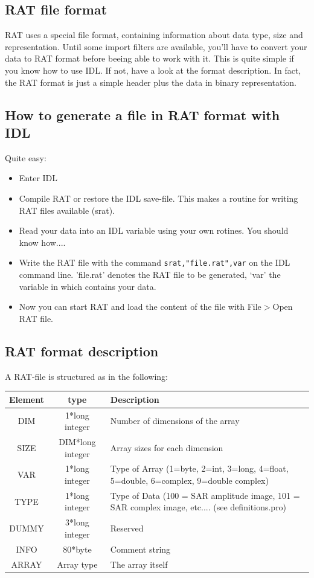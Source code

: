 \subsection{RAT file format}

RAT uses a special file format, containing information about data type, size and representation. Until some import filters are available, you'll have to convert your data to RAT format before beeing able to work with it. This is quite simple if you know how to use IDL. If not, have a look at the format description. In fact, the RAT format is just a simple header plus the data in binary representation.

\subsection{How to generate a file in RAT format with IDL}

Quite easy:
 
\begin{itemize}
	\item Enter IDL
	\item Compile RAT or restore the IDL save-file. This makes a routine for writing RAT files available (srat).
	\item Read your data into an IDL variable using your own rotines. You should know how....
	\item Write the RAT file with the command \verb*|srat,"file.rat",var| on the IDL command line. 'file.rat' denotes the RAT file to be generated, `var' the variable in which contains your data.
	\item Now you can start RAT and load the content of the file  with File$>$Open RAT file.
\end{itemize} 

\subsection{RAT format description}

A RAT-file is structured as in the following:

\begin{center}
\begin{tabular}{|c|c|p{10cm}|}
\hline 
Element & \textbf{type} & \textbf{Description} \\ 
\hline
\hline
DIM & 1*long integer & Number of dimensions of the array \\
\hline
SIZE & DIM*long integer & Array sizes for each dimension \\
\hline
VAR & 1*long integer & Type of Array (1=byte, 2=int, 3=long, 4=float, 5=double, 6=complex, 9=double complex) \\
\hline
TYPE & 1*long integer & Type of Data (100 = SAR amplitude image, 101 = SAR complex image, etc.... (see definitions.pro) \\
\hline
DUMMY & 3*long integer & Reserved \\
\hline
INFO & 80*byte & Comment string \\
\hline
ARRAY & Array type & The array itself \\
\hline 
\end{tabular}\\
\end{center}

